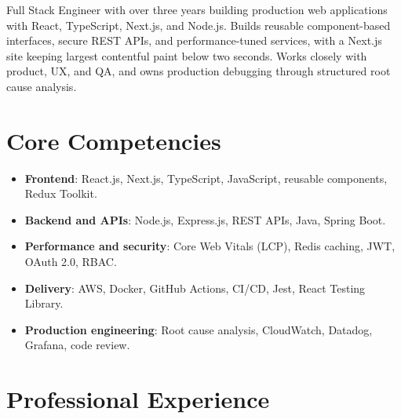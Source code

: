 \documentclass[11pt,a4paper,sans]{moderncv}
\begin{document}
\makecvtitle

\vspace{6pt}
{\small Full Stack Engineer with over three years building production web applications with React, TypeScript, Next.js, and Node.js. Builds reusable component-based interfaces, secure REST APIs, and performance-tuned services, with a Next.js site keeping largest contentful paint below two seconds. Works closely with product, UX, and QA, and owns production debugging through structured root cause analysis.\par}

\section{Core Competencies}
\vspace{1pt}
\begin{itemize}

\item \textbf{Frontend}: React.js, Next.js, TypeScript, JavaScript, reusable components, Redux Toolkit.

\item \textbf{Backend and APIs}: Node.js, Express.js, REST APIs, Java, Spring Boot.

\item \textbf{Performance and security}: Core Web Vitals (LCP), Redis caching, JWT, OAuth 2.0, RBAC.

\item \textbf{Delivery}: AWS, Docker, GitHub Actions, CI/CD, Jest, React Testing Library.

\item \textbf{Production engineering}: Root cause analysis, CloudWatch, Datadog, Grafana, code review.

\end{itemize}

\section{Professional Experience}
\vspace{3pt}
\end{document}
